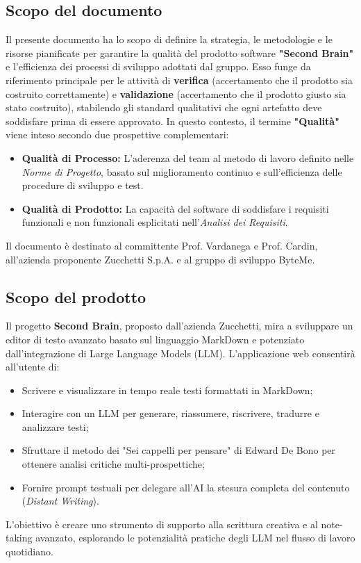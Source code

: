 \documentclass[11pt,a4paper]{article}
\begin{document}
\subsection{Scopo del documento}
Il presente documento ha lo scopo di definire la strategia, le metodologie e le risorse pianificate per garantire la qualità del prodotto software \textbf{"Second Brain"} e l'efficienza dei processi di sviluppo adottati dal gruppo. Esso funge da riferimento principale per le attività di \textbf{verifica} (accertamento che il prodotto sia costruito correttamente) e \textbf{validazione} (accertamento che il prodotto giusto sia stato costruito), stabilendo gli standard qualitativi che ogni artefatto deve soddisfare prima di essere approvato.
In questo contesto, il termine \textbf{"Qualità"} viene inteso secondo due prospettive complementari:
\begin{itemize}
    \item \textbf{Qualità di Processo:} L'aderenza del team al metodo di lavoro definito nelle \textit{Norme di Progetto}, basato sul miglioramento continuo e sull'efficienza delle procedure di sviluppo e test.
    \item \textbf{Qualità di Prodotto:} La capacità del software di soddisfare i requisiti funzionali e non funzionali esplicitati nell'\textit{Analisi dei Requisiti}.
\end{itemize}
Il documento è destinato al committente Prof. Vardanega e Prof. Cardin, all'azienda proponente Zucchetti S.p.A. e al gruppo di sviluppo ByteMe.

\subsection{Scopo del prodotto}
Il progetto \textbf{Second Brain}, proposto dall'azienda Zucchetti, mira a sviluppare un editor di testo avanzato basato sul linguaggio MarkDown e potenziato dall'integrazione di Large Language Models (LLM).
L'applicazione web consentirà all'utente di:
\begin{itemize}
    \item Scrivere e visualizzare in tempo reale testi formattati in MarkDown;
    \item Interagire con un LLM per generare, riassumere, riscrivere, tradurre e analizzare testi;
    \item Sfruttare il metodo dei "Sei cappelli per pensare" di Edward De Bono per ottenere analisi critiche multi-prospettiche;
    \item Fornire prompt testuali per delegare all'AI la stesura completa del contenuto (\textit{Distant Writing}).
\end{itemize}
L'obiettivo è creare uno strumento di supporto alla scrittura creativa e al note-taking avanzato, esplorando le potenzialità pratiche degli LLM nel flusso di lavoro quotidiano.
\end{document}
